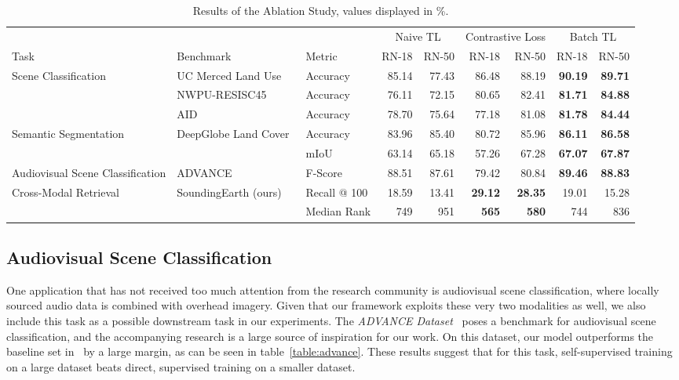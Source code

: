 \documentclass[journal]{IEEEtran}
\begin{document}
\begin{table*}
  \center
  \caption{
    Results of the Ablation Study, values displayed in \%.
  }\label{table:ablation}
  \begin{tabular}{lllrrrrrr}
    \toprule
    &&&\multicolumn{2}{c}{Naive TL}&\multicolumn{2}{c}{Contrastive Loss}&\multicolumn{2}{c}{Batch TL}\\
    \cmidrule(lr){4-5}
    \cmidrule(lr){6-7}
    \cmidrule(lr){8-9}
    Task&Benchmark&Metric&RN-18&RN-50&RN-18&RN-50&RN-18&RN-50\\
    \midrule
    \multirow{3}{*}{Scene Classification}&UC Merced Land Use~\cite{ucmerced}&Accuracy&85.14&77.43&86.48&88.19&\textbf{90.19}&\textbf{89.71}\\
    &NWPU-RESISC45~\cite{resisc45}&Accuracy&76.11&72.15&80.65&82.41&\textbf{81.71}&\textbf{84.88}\\
    &AID~\cite{xia_aid_2017}&Accuracy&78.70&75.64&77.18&81.08&\textbf{81.78}&\textbf{84.44}\\
    \midrule
    \multirow{2}{*}{Semantic Segmentation}&\multirow{2}{*}{DeepGlobe Land Cover~\cite{deepglobe}}&Accuracy&83.96&85.40&80.72&85.96&\textbf{86.11}&\textbf{86.58}
    \\
    &&mIoU&63.14&65.18&57.26&67.28&\textbf{67.07}&\textbf{67.87}
    \\
    \midrule
    Audiovisual Scene Classification&ADVANCE~\cite{hu_cross-task_2020}&F-Score&88.51&87.61&79.42&80.84&\textbf{89.46}&\textbf{88.83}\\
    \midrule
    \multirow{2}{*}{Cross-Modal Retrieval}&\multirow{2}{*}{SoundingEarth (ours)}&Recall @ 100&18.59&13.41&\textbf{29.12}&\textbf{28.35}&19.01&15.28\\
    &&Median Rank&749&951&\textbf{565}&\textbf{580}&744&836\\
    \bottomrule
  \end{tabular}
\end{table*} 
\subsection{Audiovisual Scene Classification}
One application that has not received too much attention from the research community
is audiovisual scene classification,
where locally sourced audio data is combined with overhead imagery.
Given that our framework exploits these very two modalities as well,
we also include this task as a possible downstream task in our experiments.
The \emph{ADVANCE Dataset}~\cite{hu_cross-task_2020} poses a benchmark
for audiovisual scene classification,
and the accompanying research is a large source of inspiration for our work.
On this dataset, our model outperforms the baseline set in~\cite{hu_cross-task_2020} by a large margin,
as can be seen in table~\ref{table:advance}.
These results suggest that for this task,
self-supervised training on a large dataset
beats direct, supervised training on a smaller dataset.
\end{document}
